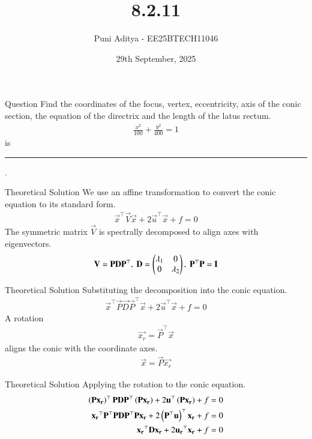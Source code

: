 \documentclass{beamer}
\title{8.2.11}
\date{29th September, 2025}
\author{Puni Aditya - EE25BTECH11046}
\begin{document}
\frame{\titlepage}
\begin{frame}{Question}
Find the coordinates of the focus, vertex, eccentricity, axis of the conic section, the equation of the directrix and the length of the latus rectum.
\begin{align*}
    \frac{x^2}{100} + \frac{y^2}{400} = 1
\end{align*}
is \rule{2cm}{0.4pt}.
\end{frame}

\begin{frame}{Theoretical Solution}
We use an affine transformation to convert the conic equation to its standard form.
\begin{align*}
    \vec{x}^\top\vec{V}\vec{x} + 2\vec{u}^\top\vec{x} + f = 0
\end{align*}
The symmetric matrix $\vec{V}$ is spectrally decomposed to align axes with eigenvectors.
\begin{align}
    \mathbf{V} = \mathbf{P}\mathbf{D}\mathbf{P}^\top, \text{ } \mathbf{D} = \begin{pmatrix}\lambda_1 & 0 \\ 0 & \lambda_2\end{pmatrix}, \text{ } \mathbf{P}^\top\mathbf{P} = \mathbf{I}
\end{align}
\end{frame}

\begin{frame}{Theoretical Solution}
Substituting the decomposition into the conic equation.
\begin{align}
    \vec{x}^\top\vec{P}\vec{D}\vec{P}^\top\vec{x} + 2\vec{u}^\top\vec{x} + f = 0
\end{align}
A rotation
\begin{align}
    \vec{x_r} = \vec{P}^\top\vec{x} 
\end{align}
aligns the conic with the coordinate axes.
\begin{align}
    \vec{x} = \vec{P}\vec{x_r}
\end{align}
\end{frame}

\begin{frame}{Theoretical Solution}
Applying the rotation to the conic equation.
\begin{align}
    \left(\mathbf{P}\mathbf{x_r}\right)^\top\mathbf{P}\mathbf{D}\mathbf{P}^\top\left(\mathbf{P}\mathbf{x_r}\right) + 2\mathbf{u}^\top\left(\mathbf{P}\mathbf{x_r}\right) + f &= 0 \\
    \mathbf{x_r}^\top\mathbf{P}^\top\mathbf{P}\mathbf{D}\mathbf{P}^\top\mathbf{P}\mathbf{x_r} + 2\left(\mathbf{P}^\top\mathbf{u}\right)^\top\mathbf{x_r} + f &= 0 \\
    \mathbf{x_r}^\top\mathbf{D}\mathbf{x_r} + 2\mathbf{u_r}^\top\mathbf{x_r} + f &= 0
\end{align}
\end{frame}
\end{document}
